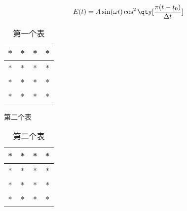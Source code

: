 
\begin{equation}
E(t) = A \sin(\omega t)\cos^2\qty[\frac{\pi (t - t_0)}{\Delta t}]
\end{equation}

\begin{table}[ht]
\centering
\caption{第一个表}\label{test_tab1}
\begin{tabular}{|c|c|c|c|}
\hline
* & * & * & * \\
\hline
* & * & * & * \\
\hline
* & * & * & * \\
\hline
* & * & * & * \\
\hline
\end{tabular}
\end{table}

第二个表
\begin{table}[ht]
\centering
\caption{第二个表}\label{test_tab2}
\begin{tabular}{|c|c|c|c|}
\hline
* & * & * & * \\
\hline
* & * & * & * \\
\hline
* & * & * & * \\
\hline
* & * & * & * \\
\hline
\end{tabular}
\end{table}
